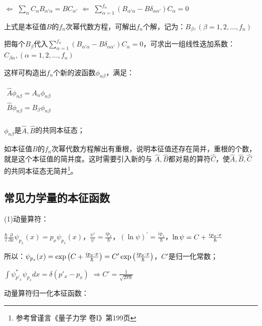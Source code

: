 $ \Leftarrow $
$\sum\limits_\alpha  {C_\alpha  B_{\alpha '\alpha } }  = BC_{\alpha '} $
$ \Leftarrow $
$\sum\limits_{\alpha  = 1}^{f_n } {\left( {B_{\alpha '\alpha }  - B\delta _{\alpha \alpha '} } \right)C_\alpha  }  = 0$

上式是本征值$B$的$f_n$次幂代数方程，可解出$f_n$个解，记为：$B_\beta  ,(\beta  = 1,2,...,f_n )$

把每个$B_\beta  $代入$\sum\limits_{\alpha  = 1}^{f_n } {\left( {B_{\alpha '\alpha }  - B\delta _{\alpha \alpha '} } \right)C_\alpha  }  = 0$，可求出一组线性迭加系数：$C_{\beta \alpha } ,(\alpha  = 1,2,...,f_n )$

这样可构造出$f_n$个新的波函数$\phi _{n\beta } $，满足：

\begin{center}
$\begin{array}{l}
 \hat A\phi _{n\beta }  = A_n \phi _{n\beta }  \\
 \hat B\phi _{n\beta }  = B_\beta  \phi _{n\beta }  \\
 \end{array}$
\end{center}


$\phi _{n\beta } $是$\hat A,\hat B$的共同本征态；

如本征值$B$的$f_n$次幂代数方程解出有重根，说明本征值还存在简并，重根的个数，就是这个本征值的简并度。这时需要引入新的与 $\hat A, \hat B$都对易的算符$\hat C$，使$\hat A, \hat B, \hat C$的共同本征态无简并\footnote{参考曾谨言《量子力学 卷I》第199页}。

\subsection{常见力学量的本征函数}

(1)动量算符：

$\frac{\hbar }{i}\frac{\partial }{{\partial x}}\psi _{p_x } (x) = p_x \psi _{p_x } (x)$，$\frac{{\psi '}}{\psi } = \frac{{ip_x }}{\hbar }$，$\left( {\ln \psi } \right)^\prime   = \frac{{ip_x }}{\hbar }$，$\ln \psi  = C + {\textstyle{{ip_x  \cdot x} \over \hbar }}$

所以：$\psi _{p_x } (x) = \exp \left( {C + {\textstyle{{ip_x  \cdot x} \over \hbar }}} \right) = C'\exp \left( {{\textstyle{{ip_x  \cdot x} \over \hbar }}} \right)$，$C'$是归一化常数；

$\int {\psi _{p'_x } ^* \psi _{p_x } dx}  = \delta \left( {p'_x  - p_x } \right)$
$ \Rightarrow C' = \frac{1}{{\sqrt {2\pi \hbar } }}$

动量算符归一化本征函数：

